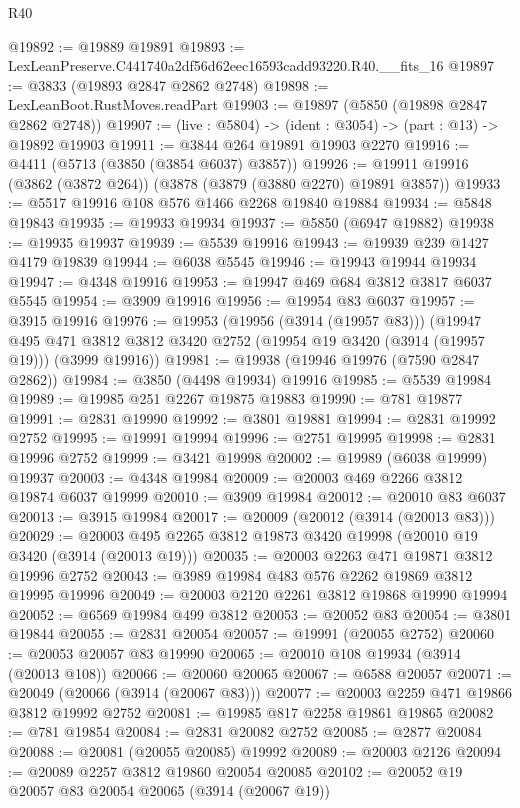 \begin{lexlean}{R40}
\begin{coremodule}
@19892 := @19889 @19891
@19893 := LexLeanPreserve.C441740a2df56d62eec16593cadd93220.R40.__fits_16
@19897 := @3833 (@19893 @2847 @2862 @2748)
@19898 := LexLeanBoot.RustMoves.readPart
@19903 := @19897 (@5850 (@19898 @2847 @2862 @2748))
@19907 := (live : @5804) -> (ident : @3054) -> (part : @13) -> @19892 @19903
@19911 := @3844 @264 @19891 @19903 @2270
@19916 := @4411 (@5713 (@3850 (@3854 @6037) @3857))
@19926 := @19911 @19916 (@3862 (@3872 @264)) (@3878 (@3879 (@3880 @2270) @19891 @3857))
@19933 := @5517 @19916 @108 @576 @1466 @2268 @19840 @19884
@19934 := @5848 @19843
@19935 := @19933 @19934
@19937 := @5850 (@6947 @19882)
@19938 := @19935 @19937
@19939 := @5539 @19916
@19943 := @19939 @239 @1427 @4179 @19839
@19944 := @6038 @5545
@19946 := @19943 @19944 @19934
@19947 := @4348 @19916
@19953 := @19947 @469 @684 @3812 @3817 @6037 @5545
@19954 := @3909 @19916
@19956 := @19954 @83 @6037
@19957 := @3915 @19916
@19976 := @19953
    (@19956 (@3914 (@19957 @83)))
    (@19947
      @495
      @471
      @3812
      @3812
      @3420
      @2752
      (@19954 @19 @3420 (@3914 (@19957 @19)))
      (@3999 @19916))
@19981 := @19938 (@19946 @19976 (@7590 @2847 @2862))
@19984 := @3850 (@4498 @19934) @19916
@19985 := @5539 @19984
@19989 := @19985 @251 @2267 @19875 @19883
@19990 := @781 @19877
@19991 := @2831 @19990
@19992 := @3801 @19881
@19994 := @2831 @19992 @2752
@19995 := @19991 @19994
@19996 := @2751 @19995
@19998 := @2831 @19996 @2752
@19999 := @3421 @19998
@20002 := @19989 (@6038 @19999) @19937
@20003 := @4348 @19984
@20009 := @20003 @469 @2266 @3812 @19874 @6037 @19999
@20010 := @3909 @19984
@20012 := @20010 @83 @6037
@20013 := @3915 @19984
@20017 := @20009 (@20012 (@3914 (@20013 @83)))
@20029 := @20003 @495 @2265 @3812 @19873 @3420 @19998 (@20010 @19 @3420 (@3914 (@20013 @19)))
@20035 := @20003 @2263 @471 @19871 @3812 @19996 @2752
@20043 := @3989 @19984 @483 @576 @2262 @19869 @3812 @19995 @19996
@20049 := @20003 @2120 @2261 @3812 @19868 @19990 @19994
@20052 := @6569 @19984 @499 @3812
@20053 := @20052 @83
@20054 := @3801 @19844
@20055 := @2831 @20054
@20057 := @19991 (@20055 @2752)
@20060 := @20053 @20057 @83 @19990
@20065 := @20010 @108 @19934 (@3914 (@20013 @108))
@20066 := @20060 @20065
@20067 := @6588 @20057
@20071 := @20049 (@20066 (@3914 (@20067 @83)))
@20077 := @20003 @2259 @471 @19866 @3812 @19992 @2752
@20081 := @19985 @817 @2258 @19861 @19865
@20082 := @781 @19854
@20084 := @2831 @20082 @2752
@20085 := @2877 @20084
@20088 := @20081 (@20055 @20085) @19992
@20089 := @20003 @2126
@20094 := @20089 @2257 @3812 @19860 @20054 @20085
@20102 := @20052 @19 @20057 @83 @20054 @20065 (@3914 (@20067 @19))

\end{coremodule}
\end{lexlean}
